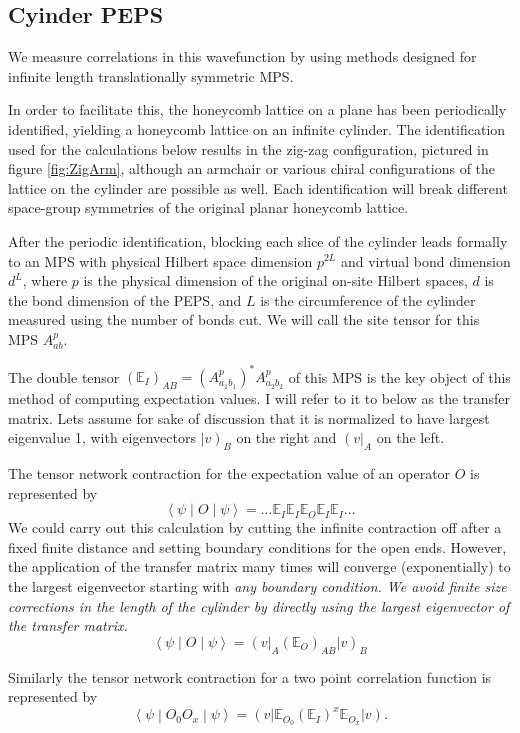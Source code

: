 \documentclass{article}
\newcommand{\braopket}[3]{\left \langle #1 \middle |#2 \middle | #3 \right \rangle}
\newcommand{\vbra}[1]{\left ( #1 \right |}
\newcommand{\vket}[1]{\left |#1 \right )}
\begin{document}
\subsection{Cyinder PEPS}

We measure correlations in this wavefunction by using methods designed for infinite length translationally symmetric MPS. 
 

In order to facilitate this, the honeycomb lattice on a plane has been periodically identified, yielding a honeycomb lattice on an infinite cylinder. The identification used for the calculations below results in the zig-zag configuration, pictured in figure \ref{fig:ZigArm},  although an armchair or various chiral configurations of the lattice on the cylinder are possible as well. Each identification will break different space-group symmetries of the original planar honeycomb lattice. 


After the periodic identification, blocking each slice of the cylinder leads formally to an MPS with physical Hilbert space dimension $p^{2L}$ and virtual bond dimension $d^{L}$, where $p$ is the physical dimension of the original on-site Hilbert spaces, $d$ is the bond dimension of the PEPS, and $L$ is the circumference of the cylinder measured using the number of bonds cut. We will call the site tensor for this MPS $A^p_{ab}$.

The double tensor $(\mathbb{E}_{I})_{AB} = (A^p_{a_1 b_1})^*A^p_{a_2 b_2}$ of this MPS is the key object of this method of computing expectation values. I will refer to it to below as the transfer matrix. Lets assume for sake of discussion that it is normalized to have largest eigenvalue 1, with eigenvectors $\vket{v}_B$ on the right and $\vbra{v}_A$ on the left.

The tensor network contraction for the expectation value of an operator $O$ is represented by 
$$
\braopket{\psi}{O}{\psi} = ...\mathbb{E}_{I} \mathbb{E}_{I} \mathbb{E}_{O} \mathbb{E}_{I} \mathbb{E}_{I} ...
$$
We could carry out this calculation by cutting the infinite contraction off after a fixed finite distance and setting boundary conditions for the open ends. However, the application of the transfer matrix many times will converge (exponentially) to the largest eigenvector starting with \em any \em boundary condition. We avoid finite size corrections in the length of the cylinder by directly using the largest eigenvector of the transfer matrix.
$$
\braopket{\psi}{O}{ \psi} = \vbra{v}_A (\mathbb{E}_{O})_{AB} \vket{v}_B
$$

Similarly the tensor network contraction for a two point correlation function is represented by 
$$
\braopket{\psi}{O_0 O_x}{ \psi} = \vbra{v} \mathbb{E}_{O_0} (\mathbb{E}_{I})^x \mathbb{E}_{O_x}\vket{v}.
$$
\end{document}
